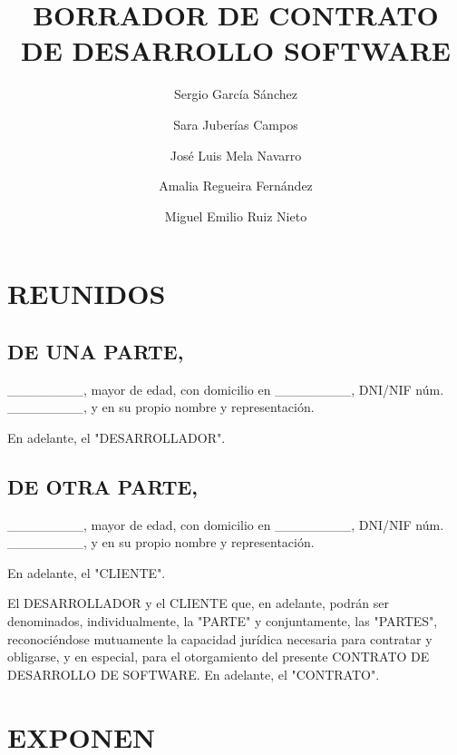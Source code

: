 \documentclass[a4paper,11pt]{report}
\begin{document}
	\title{BORRADOR DE CONTRATO DE DESARROLLO SOFTWARE}
	\author{
		Sergio García Sánchez
		\and
		Sara Juberías Campos
		\and
		José Luis Mela Navarro
		\and
		Amalia Regueira Fernández
		\and
		Miguel Emilio Ruiz Nieto
	}

	\maketitle

	\section*{REUNIDOS}

	\subsection*{DE UNA PARTE,}

	\_\_\_\_\_\_\_\_, mayor de edad, con domicilio en \_\_\_\_\_\_\_\_, DNI/NIF núm.
	\_\_\_\_\_\_\_\_, y en su propio nombre y representación.

	En adelante, el "DESARROLLADOR".

	\subsection*{DE OTRA PARTE,}

	\_\_\_\_\_\_\_\_, mayor de edad, con domicilio en \_\_\_\_\_\_\_\_, DNI/NIF núm.
	\_\_\_\_\_\_\_\_, y en su propio nombre y representación.

	En adelante, el "{CLIENTE}".

	El DESARROLLADOR y el CLIENTE que, en adelante, podrán ser denominados,
	individualmente, la "PARTE" y conjuntamente, las "PARTES",
	reconociéndose mutuamente la capacidad jurídica necesaria para contratar
	y obligarse, y en especial, para el otorgamiento del presente CONTRATO
	DE DESARROLLO DE SOFTWARE. En adelante, el "{CONTRATO}".

	\section*{EXPONEN}
\end{document}
